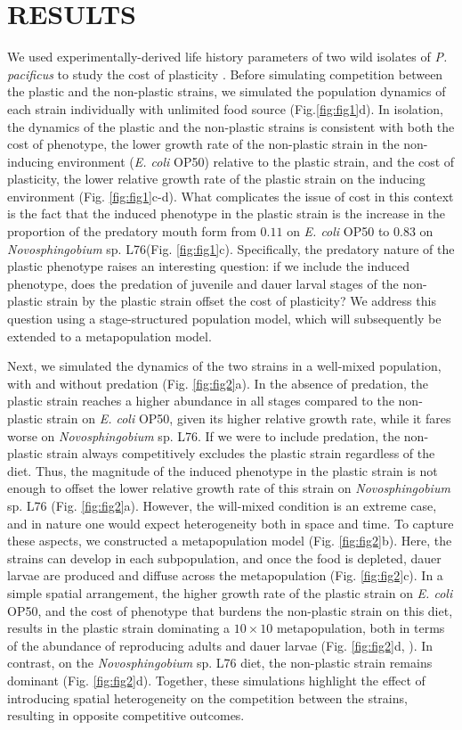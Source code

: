 \documentclass[10pt,letterpaper]{article}
\newcommand{\ecoli}{\emph{E. coli} OP50}
\newcommand{\novo}{\emph{Novosphingobium} sp. L76}
\newcommand{\ppac}{\emph{P. pacificus}}
\begin{document}
\section*{RESULTS}

We used experimentally-derived life history parameters of two wild isolates of \ppac{} to study the cost of plasticity \cite{Dardiry2023}. Before simulating competition between the plastic and the non-plastic strains, we simulated the population dynamics of each strain individually with unlimited food source (Fig.\ref{fig:fig1}d). In isolation, the dynamics of the plastic and the non-plastic strains is consistent with both the cost of phenotype, the lower growth rate of the non-plastic strain in the non-inducing environment (\ecoli{}) relative to the plastic strain, and the cost of plasticity, the lower relative growth rate of the plastic strain on the inducing environment (Fig. \ref{fig:fig1}c-d). What complicates the issue of cost in this context is the fact that the induced phenotype in the plastic strain is the increase in the proportion of the predatory mouth form from $0.11$ on \ecoli{} to $0.83$ on \novo{}(Fig. \ref{fig:fig1}c). Specifically, the predatory nature of the plastic phenotype raises an interesting question: if we include the induced phenotype, does the predation of juvenile and dauer larval stages of the non-plastic strain by the plastic strain offset the cost of plasticity? We address this question using a stage-structured population model, which will subsequently be extended to a metapopulation model.

\hspace{5cm}

Next, we simulated the dynamics of the two strains in a well-mixed population, with and without predation (Fig. \ref{fig:fig2}a). In the absence of predation, the plastic strain reaches a higher abundance in all stages compared to the non-plastic strain on \ecoli{}, given its higher relative growth rate, while it fares worse on \novo{}. If we were to include predation, the non-plastic strain always competitively excludes the plastic strain regardless of the diet. Thus, the magnitude of the induced phenotype in the plastic strain is not enough to offset the lower relative growth rate of this strain on \novo{} (Fig. \ref{fig:fig2}a). However, the will-mixed condition is an extreme case, and in nature one would expect heterogeneity both in space and time. To capture these aspects, we constructed a metapopulation model (Fig. \ref{fig:fig2}b). Here, the strains can develop in each subpopulation, and once the food is depleted, dauer larvae are produced and diffuse across the metapopulation (Fig. \ref{fig:fig2}c). In a simple spatial arrangement, the higher growth rate of the plastic strain on \ecoli{}, and the cost of phenotype that burdens the non-plastic strain on this diet, results in the plastic strain dominating a $10 \times 10$ metapopulation, both in terms of the abundance of reproducing adults and dauer larvae (Fig. \ref{fig:fig2}d, ). In contrast, on the \novo{} diet, the non-plastic strain remains dominant (Fig. \ref{fig:fig2}d). Together, these simulations highlight the effect of introducing spatial heterogeneity on the competition between the strains, resulting in opposite competitive outcomes. 
\end{document}
